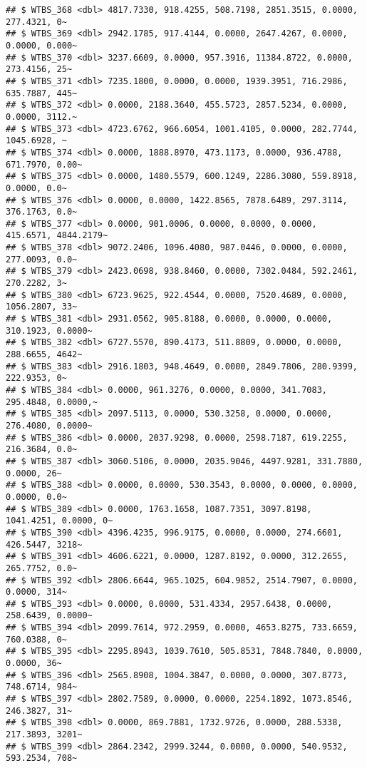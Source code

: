 \documentclass[
]{article}
\begin{document}
\begin{verbatim}
## $ WTBS_368 <dbl> 4817.7330, 918.4255, 508.7198, 2851.3515, 0.0000, 277.4321, 0~
## $ WTBS_369 <dbl> 2942.1785, 917.4144, 0.0000, 2647.4267, 0.0000, 0.0000, 0.000~
## $ WTBS_370 <dbl> 3237.6609, 0.0000, 957.3916, 11384.8722, 0.0000, 273.4156, 25~
## $ WTBS_371 <dbl> 7235.1800, 0.0000, 0.0000, 1939.3951, 716.2986, 635.7887, 445~
## $ WTBS_372 <dbl> 0.0000, 2188.3640, 455.5723, 2857.5234, 0.0000, 0.0000, 3112.~
## $ WTBS_373 <dbl> 4723.6762, 966.6054, 1001.4105, 0.0000, 282.7744, 1045.6928, ~
## $ WTBS_374 <dbl> 0.0000, 1888.8970, 473.1173, 0.0000, 936.4788, 671.7970, 0.00~
## $ WTBS_375 <dbl> 0.0000, 1480.5579, 600.1249, 2286.3080, 559.8918, 0.0000, 0.0~
## $ WTBS_376 <dbl> 0.0000, 0.0000, 1422.8565, 7878.6489, 297.3114, 376.1763, 0.0~
## $ WTBS_377 <dbl> 0.0000, 901.0006, 0.0000, 0.0000, 0.0000, 415.6571, 4844.2179~
## $ WTBS_378 <dbl> 9072.2406, 1096.4080, 987.0446, 0.0000, 0.0000, 277.0093, 0.0~
## $ WTBS_379 <dbl> 2423.0698, 938.8460, 0.0000, 7302.0484, 592.2461, 270.2282, 3~
## $ WTBS_380 <dbl> 6723.9625, 922.4544, 0.0000, 7520.4689, 0.0000, 1056.2807, 33~
## $ WTBS_381 <dbl> 2931.0562, 905.8188, 0.0000, 0.0000, 0.0000, 310.1923, 0.0000~
## $ WTBS_382 <dbl> 6727.5570, 890.4173, 511.8809, 0.0000, 0.0000, 288.6655, 4642~
## $ WTBS_383 <dbl> 2916.1803, 948.4649, 0.0000, 2849.7806, 280.9399, 222.9353, 0~
## $ WTBS_384 <dbl> 0.0000, 961.3276, 0.0000, 0.0000, 341.7083, 295.4848, 0.0000,~
## $ WTBS_385 <dbl> 2097.5113, 0.0000, 530.3258, 0.0000, 0.0000, 276.4080, 0.0000~
## $ WTBS_386 <dbl> 0.0000, 2037.9298, 0.0000, 2598.7187, 619.2255, 216.3684, 0.0~
## $ WTBS_387 <dbl> 3060.5106, 0.0000, 2035.9046, 4497.9281, 331.7880, 0.0000, 26~
## $ WTBS_388 <dbl> 0.0000, 0.0000, 530.3543, 0.0000, 0.0000, 0.0000, 0.0000, 0.0~
## $ WTBS_389 <dbl> 0.0000, 1763.1658, 1087.7351, 3097.8198, 1041.4251, 0.0000, 0~
## $ WTBS_390 <dbl> 4396.4235, 996.9175, 0.0000, 0.0000, 274.6601, 426.5447, 3218~
## $ WTBS_391 <dbl> 4606.6221, 0.0000, 1287.8192, 0.0000, 312.2655, 265.7752, 0.0~
## $ WTBS_392 <dbl> 2806.6644, 965.1025, 604.9852, 2514.7907, 0.0000, 0.0000, 314~
## $ WTBS_393 <dbl> 0.0000, 0.0000, 531.4334, 2957.6438, 0.0000, 258.6439, 0.0000~
## $ WTBS_394 <dbl> 2099.7614, 972.2959, 0.0000, 4653.8275, 733.6659, 760.0388, 0~
## $ WTBS_395 <dbl> 2295.8943, 1039.7610, 505.8531, 7848.7840, 0.0000, 0.0000, 36~
## $ WTBS_396 <dbl> 2565.8908, 1004.3847, 0.0000, 0.0000, 307.8773, 748.6714, 984~
## $ WTBS_397 <dbl> 2802.7589, 0.0000, 0.0000, 2254.1892, 1073.8546, 246.3827, 31~
## $ WTBS_398 <dbl> 0.0000, 869.7881, 1732.9726, 0.0000, 288.5338, 217.3893, 3201~
## $ WTBS_399 <dbl> 2864.2342, 2999.3244, 0.0000, 0.0000, 540.9532, 593.2534, 708~

\end{verbatim}
\end{document}
